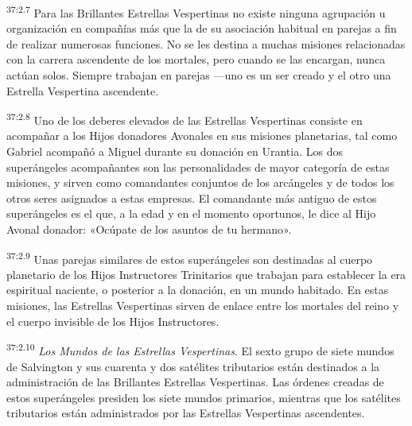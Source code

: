 \par
\textsuperscript{37:2.7} Para las Brillantes Estrellas Vespertinas no existe ninguna agrupación u organización en compañías más que la de su asociación habitual en parejas a fin de realizar numerosas funciones. No se les destina a muchas misiones relacionadas con la carrera ascendente de los mortales, pero cuando se las encargan, nunca actúan solos. Siempre trabajan en parejas ---uno es un ser creado y el otro una Estrella Vespertina ascendente.

\par
\textsuperscript{37:2.8} Uno de los deberes elevados de las Estrellas Vespertinas consiste en acompañar a los Hijos donadores Avonales en sus misiones planetarias, tal como Gabriel acompañó a Miguel durante su donación en Urantia. Los dos superángeles acompañantes son las personalidades de mayor categoría de estas misiones, y sirven como comandantes conjuntos de los arcángeles y de todos los otros seres asignados a estas empresas. El comandante más antiguo de estos superángeles es el que, a la edad y en el momento oportunos, le dice al Hijo Avonal donador: «Ocúpate de los asuntos de tu hermano».

\par
\textsuperscript{37:2.9} Unas parejas similares de estos superángeles son destinadas al cuerpo planetario de los Hijos Instructores Trinitarios que trabajan para establecer la era espiritual naciente, o posterior a la donación, en un mundo habitado. En estas misiones, las Estrellas Vespertinas sirven de enlace entre los mortales del reino y el cuerpo invisible de los Hijos Instructores.

\par
\textsuperscript{37:2.10} \textit{Los Mundos de las Estrellas Vespertinas}. El sexto grupo de siete mundos de Salvington y sus cuarenta y dos satélites tributarios están destinados a la administración de las Brillantes Estrellas Vespertinas. Las órdenes creadas de estos superángeles presiden los siete mundos primarios, mientras que los satélites tributarios están administrados por las Estrellas Vespertinas ascendentes.

